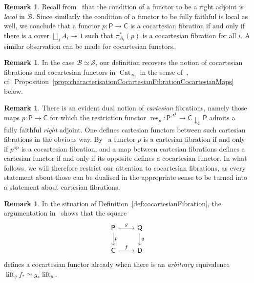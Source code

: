 \documentclass[reqno]{amsart}
\numberwithin{equation}{subsection}
\theoremstyle{plain}
\theoremstyle{definition}
\newtheorem{remark}[equation]{Remark}
\let\scr=\mathcal
\let\onto=\twoheadrightarrow
\def\BB{\scr B}
\def\SS{\scr S}
\DeclareMathOperator{\Cat}{Cat}
\DeclareMathOperator{\res}{res}
\DeclareMathOperator{\lift}{lift}
\newcommand{\op}{\mathrm{op}}
\newcommand{\I}[1]{\mathsf{#1}}
\newcommand{\Comma}[3]{{#1}\downarrow_{#2}{#3}}
\newcommand{\CatS}{\Cat_{\infty}}
\begin{document}
\begin{remark}
	\label{rem:CocartIsLocal}
	Recall from~\cite[Remark~3.3.6]{Martini2021a} that the condition of a functor to be a right adjoint is \emph{local} in $\BB$. Since similarly the condition of a functor to be fully faithful is local as well, we conclude that a functor $p\colon\I{P}\to\I{C}$ is a cocartesian fibration if and only if there is a cover $\bigsqcup_i A_i\onto 1$ such that $\pi_{A_i}^\ast(p)$ is a cocartesian fibration for all $i$. A similar observation can be made for cocartesian functors.
\end{remark}

\begin{remark}
	\label{rem:cocartesianFibrationsSpaces}
	In the case $\BB\simeq \SS$, our definition recovers the notion of cocartesian fibrations and cocartesian functors in $\CatS$ in the sense of~\cite{htt}, cf.\ Proposition~\ref{prop:characterisationCocartesianFibrationCocartesianMaps} below.
\end{remark}

\begin{remark}
	There is an evident dual notion of \emph{cartesian} fibrations, namely those maps $p\colon \I{P}\to\I{C}$ for which the restriction functor $\res_p\colon \I{P}^{\Delta^1}\to\Comma{\I{C}}{\I{C}}{\I{P}}$ admits a fully faithful \emph{right} adjoint. One defines cartesian functors between such cartesian fibrations in the obvious way. By~\cite[Proposition~3.1.14]{Martini2021a} a functor $p$ is a cartesian fibration if and only if $p^{\op}$ is a cocartesian fibration, and a map between cartesian fibrations defines a cartesian functor if and only if its opposite defines a cocartesian functor. In what follows, we will therefore restrict our attention to cocartesian fibrations, as every statement about those can be dualised in the appropriate sense to be turned into a statement about cartesian fibrations.
\end{remark}

\begin{remark}
	\label{rem:cocartesianSquaresSimplified}
	In the situation of Definition~\ref{def:cocartesianFibration}, the argumentation in~\cite[Remark~3.2.9]{Martini2021a} shows that the square
	\begin{equation*}
		\begin{tikzcd}
			\I{P}\arrow[d, "p"]\arrow[r, "g"] & \I{Q}\arrow[d, "q"]\\
			\I{C}\arrow[r, "f"] & \I{D}
		\end{tikzcd}
	\end{equation*}
	defines a cocartesian functor already when there is an \emph{arbitrary} equivalence $\lift_q f_\ast\simeq g_\ast\lift_p$.
\end{remark}
\end{document}

